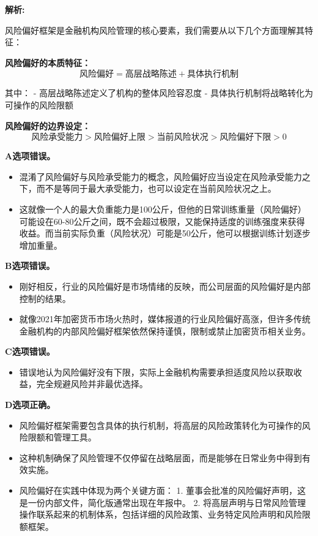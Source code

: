 \documentclass{article}
\newenvironment{explanation}
{\textbf{解析:}\par}
{\par}
\begin{document}
\begin{explanation}

    风险偏好框架是金融机构风险管理的核心要素，我们需要从以下几个方面理解其特征：

    \textbf{风险偏好的本质特征：}
    \[
    \text{风险偏好} = \text{高层战略陈述} + \text{具体执行机制}
    \]

    其中：
    - 高层战略陈述定义了机构的整体风险容忍度
    - 具体执行机制将战略转化为可操作的风险限额

    \textbf{风险偏好的边界设定：}
    \[
    \text{风险承受能力} > \text{风险偏好上限} > \text{当前风险状况} > \text{风险偏好下限} > 0
    \]

    \textbf{A选项错误。}
    \begin{itemize}
        \item 混淆了风险偏好与风险承受能力的概念，风险偏好应当设定在风险承受能力之下，而不是等同于最大承受能力，也可以设定在当前风险状况之上。
        \item 这就像一个人的最大负重能力是100公斤，但他的日常训练重量（风险偏好）可能设在60-80公斤之间，既不会超过极限，又能保持适度的训练强度来获得收益。而当前实际负重（风险状况）可能是50公斤，他可以根据训练计划逐步增加重量。
    \end{itemize}
        
        \textbf{B选项错误。}
        \begin{itemize}
            \item 刚好相反，行业的风险偏好是市场情绪的反映，而公司层面的风险偏好是内部控制的结果。
            \item 就像2021年加密货币市场火热时，媒体报道的行业风险偏好高涨，但许多传统金融机构的内部风险偏好框架依然保持谨慎，限制或禁止加密货币相关业务。
        \end{itemize}
        
        \textbf{C选项错误。}
        \begin{itemize}
            \item 错误地认为风险偏好没有下限，实际上金融机构需要承担适度风险以获取收益，完全规避风险并非最优选择。
        \end{itemize}

        \textbf{D选项正确。}
        \begin{itemize}
            \item 风险偏好框架需要包含具体的执行机制，将高层的风险政策转化为可操作的风险限额和管理工具。
            \item 这种机制确保了风险管理不仅停留在战略层面，而是能够在日常业务中得到有效实施。
           \item 风险偏好在实践中体现为两个关键方面：
            1. 董事会批准的风险偏好声明，这是一份内部文件，简化版通常出现在年报中。
            2. 将高层声明与日常风险管理操作联系起来的机制体系，包括详细的风险政策、业务特定风险声明和风险限额框架。
        \end{itemize}

\end{explanation}
\end{document}
